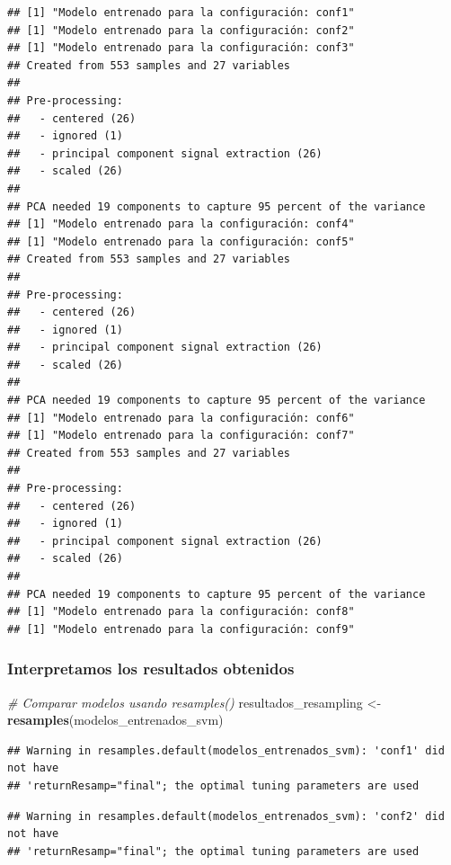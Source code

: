 \documentclass[
]{article}
\newenvironment{Shaded}{\begin{snugshade}}{\end{snugshade}}
\newcommand{\CommentTok}[1]{\textcolor[rgb]{0.56,0.35,0.01}{\textit{#1}}}
\newcommand{\FunctionTok}[1]{\textcolor[rgb]{0.13,0.29,0.53}{\textbf{#1}}}
\newcommand{\NormalTok}[1]{#1}
\newcommand{\OtherTok}[1]{\textcolor[rgb]{0.56,0.35,0.01}{#1}}
\begin{document}
\begin{verbatim}
## [1] "Modelo entrenado para la configuración: conf1"
## [1] "Modelo entrenado para la configuración: conf2"
## [1] "Modelo entrenado para la configuración: conf3"
## Created from 553 samples and 27 variables
## 
## Pre-processing:
##   - centered (26)
##   - ignored (1)
##   - principal component signal extraction (26)
##   - scaled (26)
## 
## PCA needed 19 components to capture 95 percent of the variance
## [1] "Modelo entrenado para la configuración: conf4"
## [1] "Modelo entrenado para la configuración: conf5"
## Created from 553 samples and 27 variables
## 
## Pre-processing:
##   - centered (26)
##   - ignored (1)
##   - principal component signal extraction (26)
##   - scaled (26)
## 
## PCA needed 19 components to capture 95 percent of the variance
## [1] "Modelo entrenado para la configuración: conf6"
## [1] "Modelo entrenado para la configuración: conf7"
## Created from 553 samples and 27 variables
## 
## Pre-processing:
##   - centered (26)
##   - ignored (1)
##   - principal component signal extraction (26)
##   - scaled (26)
## 
## PCA needed 19 components to capture 95 percent of the variance
## [1] "Modelo entrenado para la configuración: conf8"
## [1] "Modelo entrenado para la configuración: conf9"
\end{verbatim}

\hypertarget{interpretamos-los-resultados-obtenidos-1}{%
\subsubsection{Interpretamos los resultados
obtenidos}\label{interpretamos-los-resultados-obtenidos-1}}

\begin{Shaded}
\begin{Highlighting}[]
\CommentTok{\# Comparar modelos usando resamples()}
\NormalTok{resultados\_resampling }\OtherTok{\textless{}{-}} \FunctionTok{resamples}\NormalTok{(modelos\_entrenados\_svm)}
\end{Highlighting}
\end{Shaded}

\begin{verbatim}
## Warning in resamples.default(modelos_entrenados_svm): 'conf1' did not have
## 'returnResamp="final"; the optimal tuning parameters are used
\end{verbatim}

\begin{verbatim}
## Warning in resamples.default(modelos_entrenados_svm): 'conf2' did not have
## 'returnResamp="final"; the optimal tuning parameters are used
\end{verbatim}
\end{document}
